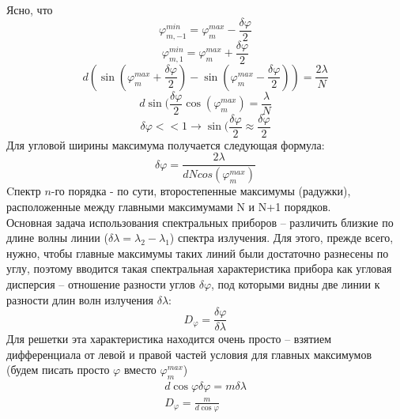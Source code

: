 \documentclass[__main__.tex]{subfiles}
\begin{document}
Ясно, что 
$$\varphi^{min}_{m, -1} = \varphi^{max}_{m} - \frac{\delta \varphi}{2}$$
$$\varphi^{min}_{m, 1} = \varphi^{max}_{m} + \frac{\delta\varphi}{2}$$
$$d(\sin(\varphi^{max}_{m} + \frac{\delta\varphi}{2}) - \sin(\varphi^{max}_{m} - \frac{\delta\varphi}{2})) = \frac{2\lambda}{N} $$
$$d\sin(\frac{\delta \varphi}{2} \cos(\varphi^{max}_m) = \frac{\lambda}{N}$$
$$\delta\varphi << 1 \rightarrow \sin(\frac{\delta\varphi}{2} \approx \frac{\delta\varphi}{2}$$
Для угловой ширины максимума получается следующая формула:
$$\delta\varphi = \frac{2\lambda}{dNcos(\varphi^{max}_m)}$$
Cпектр $n$-го порядка - по сути, второстепенные максимумы (радужки), расположенные между главными максимумами N и N+1 порядков.\\
Основная задача использования спектральных приборов – различить близкие по длине волны линии ($\delta \lambda = \lambda_2 - \lambda_1$) спектра излучения. Для этого, прежде всего, нужно, чтобы главные максимумы таких линий были достаточно разнесены по углу, поэтому вводится такая спектральная характеристика прибора как угловая дисперсия – отношение разности углов $\delta\varphi$, под которыми видны две линии к разности длин волн излучения $\delta\lambda$:
$$D_\varphi = \frac{\delta\varphi}{\delta\lambda}$$
Для решетки эта характеристика находится очень просто – взятием дифференциала от левой и правой частей условия для главных максимумов (будем писать просто $\varphi$ вместо $\varphi^{max}_m$)
\begin{gather*}
	d\cos\varphi \delta\varphi = m\delta\lambda\\
	D_\varphi = \frac{m}{d\cos \varphi}
\end{gather*}
\end{document}
